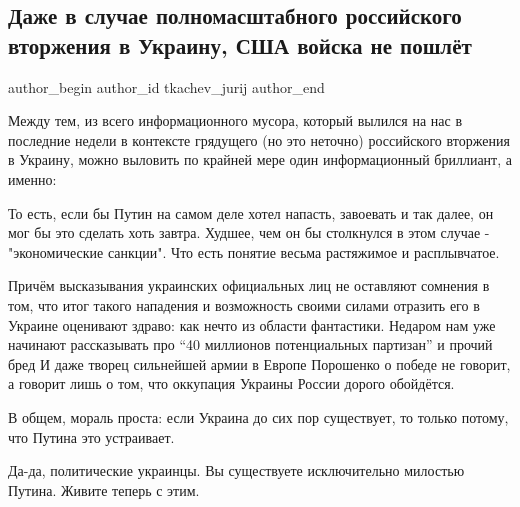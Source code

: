 
 
 
 
 
\subsection{Даже в случае полномасштабного российского вторжения в Украину, США войска не пошлёт}
\label{sec:08_12_2021.tg.tkachev_jurij.1.vtorzhenie_putin_usa}


\ifcmt
 author_begin
   author_id tkachev_jurij
 author_end
\fi

Между тем, из всего информационного мусора, который вылился на нас в последние
недели в контексте грядущего (но это неточно) российского вторжения в Украину,
можно выловить по крайней мере один информационный бриллиант, а именно: 


То есть, если бы Путин на самом деле хотел напасть, завоевать и так далее, он
мог бы это сделать хоть завтра. Худшее, чем он бы столкнулся в этом случае -
"экономические санкции". Что есть понятие весьма растяжимое и расплывчатое.

Причём высказывания украинских официальных лиц не оставляют сомнения в том, что
итог такого нападения и возможность своими силами отразить его в Украине
оценивают здраво: как нечто из области фантастики. Недаром нам уже начинают
рассказывать про \enquote{40 миллионов потенциальных партизан} и прочий бред И
даже творец сильнейшей армии в Европе Порошенко о победе не говорит, а говорит
лишь о том, что оккупация Украины России дорого обойдётся. 

В общем, мораль проста: если Украина до сих пор существует, то только потому,
что Путина это устраивает.

Да-да, политические украинцы. Вы существуете исключительно милостью Путина.
Живите теперь с этим.

